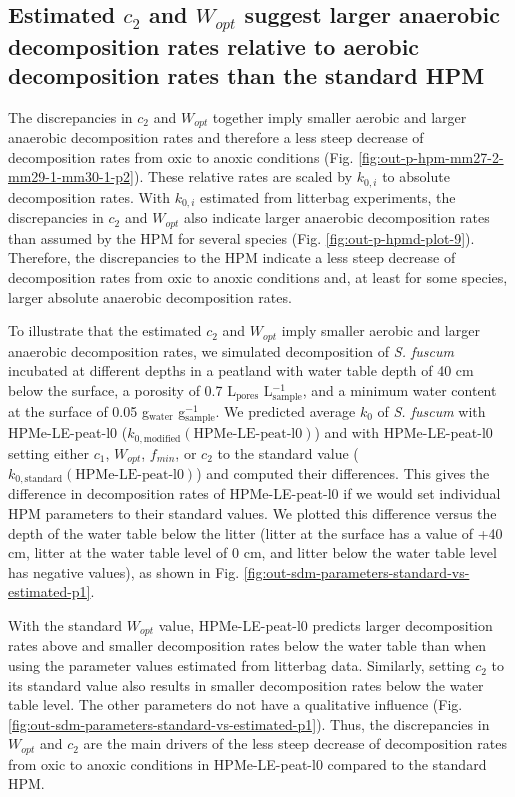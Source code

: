 \documentclass[
  12pt,
]{article}
\begin{document}
\hypertarget{out-discussion-2}{%
\subsection{\texorpdfstring{Estimated \(c_2\) and \(W_{opt}\) suggest larger anaerobic decomposition rates relative to aerobic decomposition rates than the standard HPM}{Estimated c\_2 and W\_\{opt\} suggest larger anaerobic decomposition rates relative to aerobic decomposition rates than the standard HPM}}\label{out-discussion-2}}

The discrepancies in \(c_2\) and \(W_{opt}\) together imply smaller aerobic and larger anaerobic decomposition rates and therefore a less steep decrease of decomposition rates from oxic to anoxic conditions (Fig. \ref{fig:out-p-hpm-mm27-2-mm29-1-mm30-1-p2}). These relative rates are scaled by \(k_{0,i}\) to absolute decomposition rates. With \(k_{0,i}\) estimated from litterbag experiments, the discrepancies in \(c_2\) and \(W_{opt}\) also indicate larger anaerobic decomposition rates than assumed by the HPM for several species (Fig. \ref{fig:out-p-hpmd-plot-9}). Therefore, the discrepancies to the HPM indicate a less steep decrease of decomposition rates from oxic to anoxic conditions and, at least for some species, larger absolute anaerobic decomposition rates.

To illustrate that the estimated \(c_2\) and \(W_{opt}\) imply smaller aerobic and larger anaerobic decomposition rates, we simulated decomposition of \emph{S. fuscum} incubated at different depths in a peatland with water table depth of 40 cm below the surface, a porosity of 0.7 L\(_\text{pores}\) L\(_\text{sample}^{-1}\), and a minimum water content at the surface of 0.05 g\(_\text{water}\) g\(_\text{sample}^{-1}\). We predicted average \(k_0\) of \emph{S. fuscum} with HPMe-LE-peat-l0 (\(k_{0,\text{modified}}(\text{HPMe-LE-peat-l0})\)) and with HPMe-LE-peat-l0 setting either \(c_1\), \(W_{opt}\), \(f_{min}\), or \(c_2\) to the standard value (\(k_{0,\text{standard}}(\text{HPMe-LE-peat-l0})\)) and computed their differences. This gives the difference in decomposition rates of HPMe-LE-peat-l0 if we would set individual HPM parameters to their standard values. We plotted this difference versus the depth of the water table below the litter (litter at the surface has a value of +40 cm, litter at the water table level of 0 cm, and litter below the water table level has negative values), as shown in Fig. \ref{fig:out-sdm-parameters-standard-vs-estimated-p1}.

With the standard \(W_{opt}\) value, HPMe-LE-peat-l0 predicts larger decomposition rates above and smaller decomposition rates below the water table than when using the parameter values estimated from litterbag data. Similarly, setting \(c_2\) to its standard value also results in smaller decomposition rates below the water table level. The other parameters do not have a qualitative influence (Fig. \ref{fig:out-sdm-parameters-standard-vs-estimated-p1}). Thus, the discrepancies in \(W_{opt}\) and \(c_2\) are the main drivers of the less steep decrease of decomposition rates from oxic to anoxic conditions in HPMe-LE-peat-l0 compared to the standard HPM.
\end{document}
